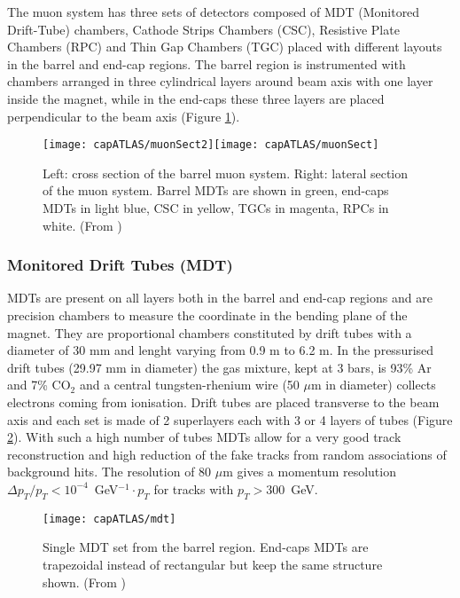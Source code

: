 The muon system has three sets of detectors composed of MDT (Monitored Drift-Tube) chambers, Cathode Strips Chambers (CSC), Resistive Plate Chambers (RPC) and Thin Gap Chambers (TGC) placed with different layouts in the barrel and end-cap regions. The barrel region is instrumented with chambers arranged in three cylindrical layers around beam axis with one layer inside the magnet, while in the end-caps these three layers are placed perpendicular to the beam axis (Figure \ref{muonSect}).

\begin{figure}[hbt]\begin{center}
\texttt{[image: capATLAS/muonSect2]}\texttt{[image: capATLAS/muonSect]}\caption{Left: cross section of the barrel muon system. Right: lateral section of the muon system. Barrel MDTs are shown in green, end-caps MDTs in light blue, CSC in yellow, TGCs in magenta, RPCs in white.  (From \cite{Aad:JINST})}\label{muonSect}
\end{center}\end{figure}


\subsubsection{Monitored Drift Tubes (MDT)}
MDTs are present on all layers both in the barrel and end-cap regions and are precision chambers to measure the coordinate in the bending plane of the magnet. They are proportional chambers constituted by drift tubes with a diameter of 30 mm and lenght varying from 0.9 m to 6.2 m. In the pressurised drift tubes (29.97 mm in diameter) the gas mixture, kept at 3 bars, is 93\% Ar and 7\% CO$_{2}$ and a central tungsten-rhenium wire (50 $\mu$m in diameter) collects electrons coming from ionisation. Drift tubes are placed transverse to the beam axis and each set is made of 2 superlayers each with 3 or 4 layers of tubes (Figure \ref{mdt}). With such a high number of tubes MDTs allow for a very good track reconstruction and high reduction of the fake tracks from random associations of background hits. The resolution of 80 $\mu$m gives a momentum resolution $\Delta p_{T}/p_{T} < 10^{-4}$~GeV$^{-1} \cdot p_{T}$ for tracks with $p_{T} > $300~GeV.%
\begin{figure}[hbt]\begin{center}
\texttt{[image: capATLAS/mdt]}\caption{Single MDT set from the barrel region. End-caps MDTs are trapezoidal instead of rectangular but keep the same structure shown. (From \cite{Aad:JINST})}\label{mdt}
\end{center}\end{figure}


